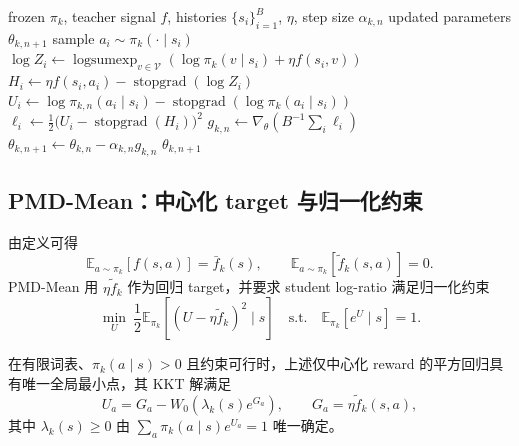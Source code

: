 \begin{algorithm}[ht]
\caption{PMD-Part inner update\\{\small\textit{Semantics: 固定 anchor 下的完整 Gibbs log-ratio 回归}}}
\begin{algorithmic}[1]
\Require frozen $\pi_k$, teacher signal $f$, histories $\{s_i\}_{i=1}^B$, $\eta$, step size $\alpha_{k,n}$
\Ensure updated parameters $\theta_{k,n+1}$
    \State sample $a_i\sim\pi_k(\cdot\mid s_i)$
    \State $\log Z_i\gets\operatorname{logsumexp}_{v\in\mathcal V}(\log\pi_k(v\mid s_i)+\eta f(s_i,v))$
    \State $H_i\gets\eta f(s_i,a_i)-\operatorname{stopgrad}(\log Z_i)$
    \State $U_i\gets\log\pi_{k,n}(a_i\mid s_i)-\operatorname{stopgrad}(\log\pi_k(a_i\mid s_i))$
    \State $\ell_i\gets\frac12\bigl(U_i-\operatorname{stopgrad}(H_i)\bigr)^2$
\EndFor
\State $g_{k,n}\gets\nabla_\theta(B^{-1}\sum_i\ell_i)$
\State $\theta_{k,n+1}\gets\theta_{k,n}-\alpha_{k,n}g_{k,n}$
\State \Return $\theta_{k,n+1}$
\end{algorithmic}
\end{algorithm}

\subsection{PMD-Mean：中心化 target 与归一化约束}
\label{sec:ch2-pmd-mean}

由定义可得
\[
\mathbb E_{a\sim\pi_k}[f(s,a)]=\bar f_k(s),
\qquad
\mathbb E_{a\sim\pi_k}[\widetilde f_k(s,a)]=0.
\]
PMD-Mean 用 $\eta\widetilde f_k$ 作为回归 target，并要求 student log-ratio 满足归一化约束
\begin{equation}
\label{eq:ch2-mean-loss}
\min_{U}\ \frac12\mathbb E_{\pi_k}\left[(U-\eta\widetilde f_k)^2\mid s\right]
\quad\text{s.t.}\quad
\mathbb E_{\pi_k}[e^{U}\mid s]=1.
\end{equation}

\begin{theorem}
\label{thm:ch2-mean-lambert}
在有限词表、$\pi_k(a\mid s)>0$ 且约束可行时，上述仅中心化 reward 的平方回归具有唯一全局最小点，其 KKT 解满足
\begin{equation}
\label{eq:ch2-mean-lambert-theorem}
U_a=G_a-W_0\!\left(\lambda_k(s)e^{G_a}\right),\qquad
G_a=\eta\widetilde f_k(s,a),
\end{equation}
其中 $\lambda_k(s)\geq0$ 由 $\sum_a\pi_k(a\mid s)e^{U_a}=1$ 唯一确定。
\end{theorem}

